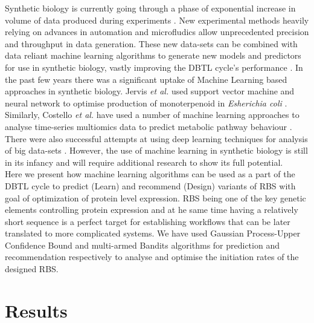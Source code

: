 \documentclass{article}
\begin{document}
Synthetic biology is currently going through a phase of exponential increase in volume of data produced during experiments \cite{Freemont2019}. New experimental methods heavily relying on advances in automation and microfludics allow unprecedented precision and throughput in data generation. These new data-sets can be combined with data reliant machine learning algorithms to generate new models and predictors for use in synthetic biology, vastly improving the DBTL cycle's performance \cite{Camacho2018}. In the past few years there was a significant uptake of Machine Learning based approaches in synthetic biology. Jervis \emph{et al.} used support vector machine and neural network to optimise production of monoterpenoid in \emph{Esherichia coli} \cite{Jervis2019}. Similarly, Costello \emph{et al.} have used a number of machine learning approaches to analyse time-series multiomics data to predict metabolic pathway behaviour \cite{Costello2018}. There were also successful attempts at using deep learning techniques for analysis of big data-sets \cite{Alipanahi2015,Angermueller2016}. However, the use of machine learning in synthetic biology is still in its infancy and will require additional research to show its full potential. \\
Here we present how machine learning algorithms can be used as a part of the DBTL cycle to predict (Learn) and recommend (Design) variants of RBS with goal of optimization of protein level expression. RBS being one of the key genetic elements controlling protein expression and at he same time having a relatively short sequence is a perfect target for establishing workflows that can be later translated to more complicated systems. We have used Gaussian Process-Upper Confidence Bound and multi-armed Bandits algorithms for prediction and recommendation respectively to analyse and optimise the initiation rates of the designed RBS.



\section{Results}
\end{document}
